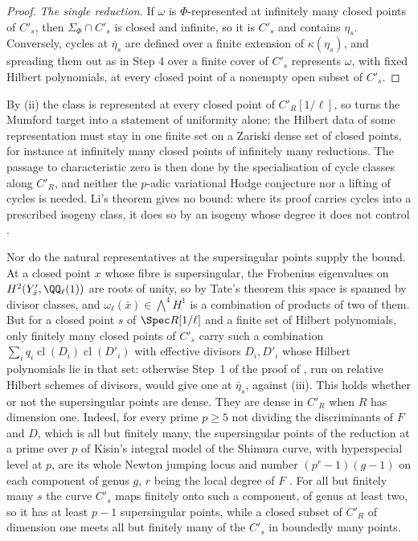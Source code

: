\begin{proof}
\emph{The single reduction.} If $\omega$ is $\Phi$-represented at infinitely
many closed points of $C'_{s}$, then $\Sigma_{\Phi}\cap C'_{s}$ is closed and
infinite, so it is $C'_{s}$ and contains $\eta_{s}$. Conversely, cycles at
$\bar\eta_{s}$ are defined over a finite extension of $\kappa(\eta_{s})$, and
spreading them out as in Step 4 over a finite cover of $C'_{s}$ represents
$\omega$, with fixed Hilbert polynomials, at every closed point of a nonempty
open subset of $C'_{s}$.
\end{proof}

\begin{remark}\label{rem:modpremains}
By (ii) the class is represented at every closed point of
$C'_{R}[1/\ell]$, so  turns the Mumford target into a
statement of uniformity alone: the Hilbert data of some representation must
stay in one finite set on a Zariski dense set of closed points, for instance
at infinitely many closed points of infinitely many reductions. The passage
to characteristic zero is then done by the specialisation of cycle classes
along $C'_{R}$, and neither the $p$-adic variational Hodge conjecture nor a
lifting of cycles is needed. Li's theorem gives no bound: where its proof
carries cycles into a prescribed isogeny class, it does so by an isogeny whose
degree it does not control \cite[proof of Theorem~1.2, Step~3]{Li26}.

Nor do the natural representatives at the supersingular points supply the
bound. At a closed point $x$ whose fibre is supersingular, the Frobenius
eigenvalues on $H^{2}(Y'_{\bar{x}},\QQ_{\ell}(1))$ are roots of unity, so by
Tate's theorem \cite{Tat66} this space is spanned by divisor classes, and
$\omega_{\ell}(\bar{x})\in{\textstyle\bigwedge^{4}}H^{1}$ is a combination of
products of two of them. But for a closed point $s$ of $\Spec R[1/\ell]$ and
a finite set of Hilbert polynomials, only finitely many closed points of
$C'_{s}$ carry such a combination $\sum_{i}q_{i}\operatorname{cl}(D_{i})
\operatorname{cl}(D'_{i})$ with effective divisors $D_{i},D'_{i}$ whose
Hilbert polynomials lie in that set: otherwise Step~1 of the proof of
, run on relative Hilbert schemes of divisors, would
give one at $\bar\eta_{s}$, against (iii). This holds whether
or not the supersingular points are dense. They are dense in $C'_{R}$ when $R$
has dimension one. Indeed, for every prime $p\ge5$ not dividing the
discriminants of $F$ and $D$, which is all but finitely many, the
supersingular points of the reduction at a prime over $p$ of Kisin's integral
model of the Shimura curve, with hyperspecial level at $p$, are its whole
Newton jumping locus and number $(p^{r}-1)(g-1)$ on each component of genus
$g$, $r$ being the local degree of $F$ \cite[Theorem~1.2 and
Corollary~5.17]{SZ11}. For all but finitely many $s$ the curve $C'_{s}$ maps
finitely onto such a component, of genus at least two, so it has at least
$p-1$ supersingular points, while a closed subset of $C'_{R}$ of dimension one
meets all but finitely many of the $C'_{s}$ in boundedly many points.


\end{remark}
